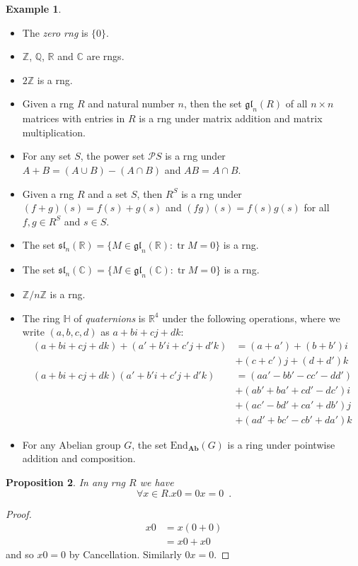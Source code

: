 \documentclass{book}
\let\qed\relax
\newtheorem{prop}{Proposition}[chapter]
\theoremstyle{definition}
\newtheorem{ex}[prop]{Example}
\newcommand{\Ab}{\ensuremath{\mathbf{Ab}}}
\newcommand{\End}[2]{\ensuremath{\mathrm{End}_{#1} \left( {#2} \right)}}
\newcommand{\gl}[2]{\ensuremath{\mathfrak{gl}_{#1} \left( {#2} \right)}}
\renewcommand{\sl}[2]{\ensuremath{\mathfrak{sl}_{#1} \left( {#2} \right)}}
\newcommand{\tr}{\ensuremath{\operatorname{tr}}}
\begin{document}
\begin{ex}
\begin{itemize}
\item The \emph{zero rng} is $\{0\}$.
\item $\mathbb{Z}$, $\mathbb{Q}$, $\mathbb{R}$ and $\mathbb{C}$ are rngs.
\item
$2 \mathbb{Z}$ is a rng.
\item
Given a rng $R$ and natural number $n$, then the set $\gl{n}{R}$ of all $n \times n$ matrices with entries in $R$ is a rng under matrix addition and matrix multiplication.
\item
For any set $S$, the power set $\mathcal{P} S$ is a rng under $A + B = (A \cup B) - (A \cap B)$ and $AB = A \cap B$.
\item
Given a rng $R$ and a set $S$, then $R^S$ is a rng under $(f + g)(s) = f(s) + g(s)$ and $(fg)(s) = f(s)g(s)$ for all $f,g \in R^S$ and $s \in S$.
\item The set $\sl{n}{\mathbb{R}} = \{ M \in \gl{n}{\mathbb{R}} : \tr M = 0 \}$ is a rng.
\item The set $\sl{n}{\mathbb{C}} = \{ M \in \gl{n}{\mathbb{C}} : \tr M = 0 \}$ is a rng.
\item $\mathbb{Z} / n \mathbb{Z}$ is a rng.
\item The ring $\mathbb{H}$ of \emph{quaternions} is $\mathbb{R}^4$ under the following operations, where we write $(a,b,c,d)$ as $a + bi + cj + dk$:
\begin{align*}
(a + bi + cj + dk) + (a' + b'i + c'j + d'k) & = (a + a') + (b + b')i\\
&  + (c + c')j + (d + d')k \\
(a + bi + cj + dk)(a' + b'i + c'j + d'k) & = 
(aa' - bb' - cc' - dd') \\
& + (ab' + ba' + cd' - dc') i \\
& + (ac' - bd' + ca' + db')j \\
& + (ad' + bc' - cb' + da') k
\end{align*}
\item For any Abelian group $G$, the set $\End{\Ab}{G}$ is a ring under pointwise addition and composition.
\end{itemize}
\end{ex}

\begin{prop}
In any rng $R$ we have
\[ \forall x \in R. x0 = 0x = 0 \enspace . \]
\end{prop}

\begin{proof}
\pf
\begin{align*}
x0 & = x(0+0) \\
& = x0+x0
\end{align*}
and so $x0 = 0$ by Cancellation. Similarly $0x = 0$. \qed
\end{proof}
\end{document}
